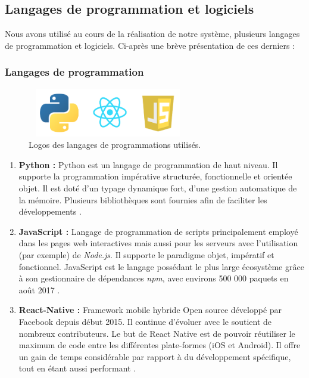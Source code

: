 \subsection{Langages de programmation et logiciels}
    Nous avons utilisé au cours de la réalisation de notre système, plusieurs langages de programmation et logiciels. Ci-après une brève présentation de ces derniers :
        \subsubsection{Langages de programmation}
            \begin{figure}[H]
                    \centering
                    \includegraphics[height=60pt,width=200pt]{img/chapter4/tools/language.png}
                    \caption{Logos des langages de programmations utilisés.}
                    \label{}
            \end{figure}
            \begin{enumerate}[leftmargin=*]
                \item{\textbf{Python : }}
                Python est un langage de programmation de haut niveau. Il supporte la programmation impérative structurée, fonctionnelle et orientée objet. Il est doté d'un typage dynamique fort, d'une gestion automatique de la mémoire. Plusieurs bibliothèques sont fournies afin de faciliter les développements \cite{python}.\\

                \item{\textbf{JavaScript : }}
                Langage de programmation de scripts principalement employé dans les pages web interactives mais aussi pour les serveurs avec l'utilisation (par exemple) de \emph{Node.js}. Il supporte le paradigme objet, impératif et fonctionnel. JavaScript est le langage possédant le plus large écosystème grâce à son gestionnaire de dépendances \emph{npm}, avec environs 500 000 paquets en août 2017 \cite{javascript}.\\

                \item{\textbf{React-Native : }}
                Framework mobile hybride Open source développé par Facebook depuis début 2015. Il continue d'évoluer avec le soutient de nombreux contributeurs. Le but de React Native est de pouvoir réutiliser le maximum de code entre les différentes plate-formes (iOS et Android). Il offre un gain de temps considérable par rapport à du développement spécifique, tout en étant aussi performant \cite{reactnative}.
            \end{enumerate}

